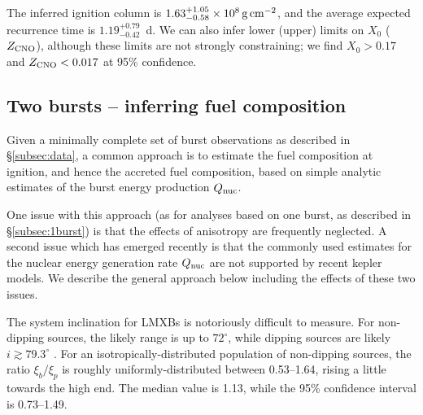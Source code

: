 \documentclass{aastex63}
\newcommand{\Xb}{\ensuremath{\overline{X}}}
\begin{document}
The inferred ignition column is $1.63_{-0.58}^{+1.05}\times10^8\,{\rm g\,cm^{-2}}$, and the average expected recurrence time is $1.19_{-0.42}^{+0.79}$~d. 
%
We can also infer lower (upper) limits on $X_0$ ($Z_{\rm CNO}$), although these limits are not strongly constraining; we find $X_0>0.17$ and $Z_{\rm  CNO}<0.017$ at 95\% confidence.


\subsection{Two bursts -- inferring fuel composition} 
\label{subsec:fuelcomp}

Given a minimally complete set of burst observations as described in \S\ref{subsec:data}, a common approach \cite[e.g][]{falanga11} is to estimate the fuel composition at ignition, and hence the accreted fuel composition, based on simple analytic estimates of the burst energy production $Q_{\rm nuc}$.

One issue with this approach (as for analyses based on one burst, as described in \S\ref{subsec:1burst}) is that the effects of anisotropy are frequently neglected.
%
A second issue which has emerged recently is that the commonly used estimates for the nuclear energy generation rate $Q_{\rm nuc}$ are not supported by recent {\sc kepler} models. 
%
We describe the general approach below including the effects of these two issues.

The system inclination for LMXBs is notoriously difficult to measure. For non-dipping sources, the likely range is up to $72^\circ$, while dipping sources are likely $i\gtrsim79.3^\circ$ \cite[]{gal16a}.
% 
For an isotropically-distributed population of non-dipping sources, the ratio $\xi_b/\xi_p$ is roughly uniformly-distributed between 0.53--1.64, rising a little towards the high end. The median value is 1.13, while the 95\% confidence interval is 0.73--1.49.
\end{document}
